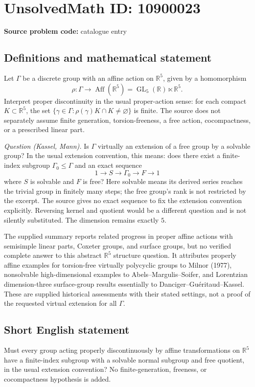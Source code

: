\documentclass[11pt]{article}
\newcommand{\R}{\mathbb{R}}
\begin{document}
\section*{UnsolvedMath ID: 10900023}
\textbf{Source problem code:} catalogue entry
\subsection{Definitions and mathematical statement}
Let \(\Gamma\) be a discrete group with an affine action on \(\R^5\), given by a homomorphism
\[
 \rho:\Gamma\to\operatorname{Aff}(\R^5)
 =\operatorname{GL}_5(\R)\ltimes\R^5.
\]
Interpret proper discontinuity in the usual proper-action sense: for each compact \(K\subset\R^5\), the set \(\{\gamma\in\Gamma:\rho(\gamma)K\cap K\neq\varnothing\}\) is finite. The source does not separately assume finite generation, torsion-freeness, a free action, cocompactness, or a prescribed linear part.

\emph{Question (Kassel, Mann).} Is \(\Gamma\) virtually an extension of a free group by a solvable group? In the usual extension convention, this means: does there exist a finite-index subgroup \(\Gamma_0\leq\Gamma\) and an exact sequence
\[
 1\longrightarrow S\longrightarrow\Gamma_0\longrightarrow F\longrightarrow1
\]
where \(S\) is solvable and \(F\) is free? Here solvable means its derived series reaches the trivial group in finitely many steps; the free group's rank is not restricted by the excerpt. The source gives no exact sequence to fix the extension convention explicitly. Reversing kernel and quotient would be a different question and is not silently substituted. The dimension remains exactly \(5\).

The supplied summary reports related progress in proper affine actions with semisimple linear parts, Coxeter groups, and surface groups, but no verified complete answer to this abstract \(\R^5\) structure question. It attributes properly affine examples for torsion-free virtually polycyclic groups to Milnor (1977), nonsolvable high-dimensional examples to Abels--Margulis--Soifer, and Lorentzian dimension-three surface-group results essentially to Danciger--Gu\'{e}ritaud--Kassel. These are supplied historical assessments with their stated settings, not a proof of the requested virtual extension for all \(\Gamma\).
\subsection{Short English statement}
Must every group acting properly discontinuously by affine transformations on \(\R^5\) have a finite-index subgroup with a solvable normal subgroup and free quotient, in the usual extension convention? No finite-generation, freeness, or cocompactness hypothesis is added.
\end{document}
